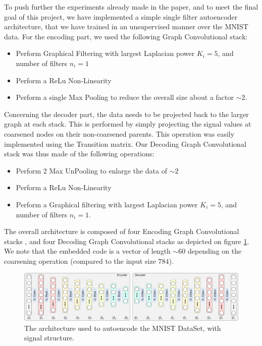 To push further the experiments already made in the paper, and to meet the final goal of this project, we have implemented a simple single filter autoencoder architecture, that we have trained in an unsupervised manner over the MNIST data. For the encoding part, we used the following Graph Convolutional stack:
\begin{itemize}
    \item Perform Graphical Filtering with largest Laplacian power $K_i=5$, and number of filters $n_i=1$
    \item Perform a ReLu Non-Linearity
    \item Perform a single Max Pooling to reduce the overall size about a factor $\sim 2$.
\end{itemize}
Concerning the decoder part, the data needs to be projected back to the larger graph at each stack. This is performed by simply projecting the signal values at coarsened nodes on their non-coarsened parents. This operation was easily implemented using the Transition matrix. Our Decoding Graph Convolutional stack was thus made of the following operations: 
\begin{itemize}
    \item Perform 2 Max UnPooling to enlarge the data of $\sim 2$
    \item Perform a ReLu Non-Linearity
    \item Perform a Graphical filtering with largest Laplacian power $K_i=5$, and number of filters $n_i=1$.
\end{itemize}

The overall architecture is composed of four Encoding Graph Convolutional stacks , and four Decoding Graph Convolutional stacks as depicted on figure \ref{fig:autoencoder}. We note that the embedded code is a vector of length $\sim60$ depending on the coarsening operation (compared to the input size $784$). 

\begin{figure}
    \centering 
    \includegraphics[width=\textwidth]{img/autoencoder.pdf}
    \caption{The architecture used to autoencode the MNIST DataSet, with signal structure.}
    \label{fig:autoencoder}
\end{figure}

